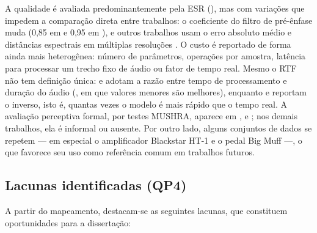\documentclass[%
  a4paper,%
  12pt,%
  fleqn,%
  english,%
  brazilian,%
]{article}
\begin{document}
A qualidade é avaliada predominantemente pela ESR (), mas com variações que impedem a comparação direta entre trabalhos: o coeficiente do filtro de pré-ênfase muda (0,85 em \textcite{Sudholt2023} e 0,95 em \textcite{Sato2026}), e outros trabalhos usam o erro absoluto médio e distâncias espectrais em múltiplas resoluções \cite{Ringhofer2024,Yeh2024,Simionato2025}.
O custo é reportado de forma ainda mais heterogênea: número de parâmetros, operações por amostra, latência para processar um trecho fixo de áudio ou fator de tempo real.
Mesmo o RTF não tem definição única: \textcite{Sudholt2023} e \textcite{Sato2026} adotam a razão entre tempo de processamento e duração do áudio (, em que valores menores são melhores), enquanto \textcite{Steinmetz2022} e \textcite{Atkinson2025} reportam o inverso, isto é, quantas vezes o modelo é mais rápido que o tempo real.
A avaliação perceptiva formal, por testes MUSHRA, aparece em \textcite{Wright2020}, \textcite{Sudholt2023} e \textcite{Simionato2025}; nos demais trabalhos, ela é informal ou ausente.
Por outro lado, alguns conjuntos de dados se repetem --- em especial o amplificador Blackstar HT-1 e o pedal Big Muff \cite{Wright2019,Sudholt2023,Simionato2025} ---, o que favorece seu uso como referência comum em trabalhos futuros.

\subsection{Lacunas identificadas (QP4)}%
\label{ssect:lacunas}

A partir do mapeamento, destacam-se as seguintes lacunas, que constituem oportunidades para a dissertação:
\end{document}
